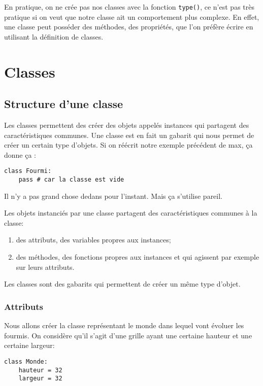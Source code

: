 En pratique, on ne crée pas nos classes avec la fonction \texttt{type()}, ce n'est pas très pratique si on veut que notre classe ait un comportement plus complexe. En effet, une classe peut posséder des méthodes, des propriétés, que l'on préfère écrire en utilisant la définition de classes.

\section{Classes}

\subsection{Structure d'une classe}

Les classes permettent des créer des objets appelés instances qui partagent des caractéristiques communes. Une classe est en fait un gabarit qui nous permet de créer un certain type d'objets. Si on réécrit notre exemple précédent de max, ça donne ça :

\begin{verbatim}
class Fourmi:
    pass # car la classe est vide
\end{verbatim}

Il n'y a pas grand chose dedans pour l'instant. Mais ça s'utilise pareil.\medskip

Les objets instanciés par une classe partagent des caractéristiques communes à la classe:
\begin{enumerate}
    \item des attributs, des variables propres aux instances;
    \item des méthodes, des fonctions propres aux instances et qui agissent par exemple sur leurs attributs.
\end{enumerate}

Les classes sont des gabarits qui permettent de créer un même type d'objet.

\subsubsection{Attributs}

Nous allons créer la classe représentant le monde dans lequel vont évoluer les fourmis. On considère qu'il
s'agit d'une grille ayant une certaine hauteur et une certaine largeur:

\begin{verbatim}
class Monde:
    hauteur = 32
    largeur = 32
\end{verbatim}

